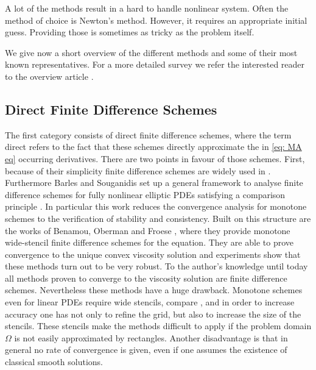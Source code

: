 A lot of the methods result in a hard to handle nonlinear system. Often the method of choice is Newton's method. However, it requires an appropriate initial guess. Providing those is sometimes as tricky as the problem itself.

We give now a short overview of the different methods and some of their most known representatives. For a more detailed survey we refer the interested reader to the overview article \cite{FGN2013}.


\subsection{Direct Finite Difference Schemes}

The first category consists of direct finite difference schemes, where the term direct refers to the fact that these schemes directly approximate the in \eqref{eq: MA eq} occurring derivatives. 
There are two points in favour of those schemes. First, because of their simplicity finite difference schemes are widely used in . Furthermore Barles and Souganidis set up a general framework to analyse finite difference schemes for fully nonlinear elliptic PDEs satisfying a comparison principle \cite{BS1991}. In particular this work reduces the convergence analysis for monotone schemes to the verification of stability and consistency.
Built on this structure are the works of Benamou, Oberman and Froese \cite{BFO2010, Oberman2008, FO2011}, where they provide monotone wide-stencil finite difference schemes for the \MA equation.
They are able to prove convergence to the unique convex viscosity solution and experiments show that these methods turn out to be very robust. To the author's knowledge until today all methods proven to converge to the viscosity solution are finite difference schemes.
Nevertheless these methods have a huge drawback. Monotone schemes even for linear PDEs require wide stencils, compare \cite{MW1953}, and in order to increase accuracy one has not only to refine the grid, but also to increase the size of the stencils. These stencils make the methods difficult to apply if the problem domain $\Omega$ is not easily approximated by rectangles. Another disadvantage is that in general no rate of convergence is given, even if one assumes the existence of classical smooth solutions.

